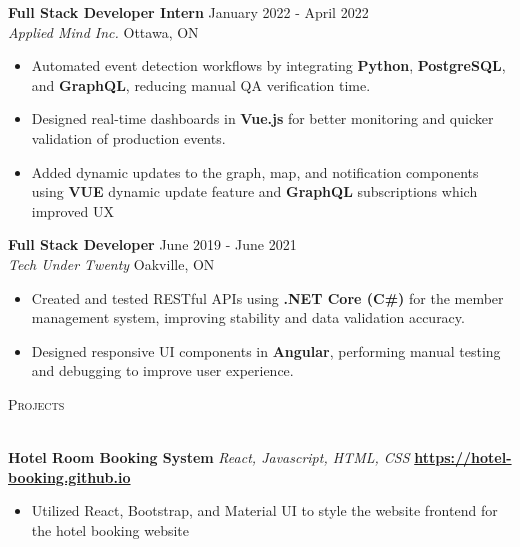 \documentclass[a4paper]{article}
\newcommand{\header} [1] {
    {\hspace*{-18pt}\vspace*{6pt} \textsc{#1}}
    \vspace*{-6pt} \\
    \hspace*{-18pt} \hrulefill \\
}
\begin{document}
\textbf{Full Stack Developer Intern} \hfill January 2022 - April 2022\\
\textit{Applied Mind Inc.} \hfill Ottawa, ON\\
\vspace{-2mm}
\begin{itemize} \itemsep -2pt
    \item Automated event detection workflows by integrating \textbf{Python}, \textbf{PostgreSQL}, and \textbf{GraphQL}, reducing manual QA verification time.
    \item Designed real-time dashboards in \textbf{Vue.js} for better monitoring and quicker validation of production events.
     \item Added dynamic updates to the graph, map, and notification components using \textbf{VUE} dynamic update feature and \textbf{GraphQL} subscriptions which improved UX
\end{itemize}

\textbf{Full Stack Developer} \hfill June 2019 - June 2021\\
\textit{Tech Under Twenty} \hfill Oakville, ON\\
\vspace{-2mm}
\begin{itemize} \itemsep -2pt
    \item Created and tested RESTful APIs using \textbf{.NET Core (C\#)} for the member management system, improving stability and data validation accuracy.
    \item Designed responsive UI components in \textbf{Angular}, performing manual testing and debugging to improve user experience.
\end{itemize}

\header{Projects}
\vspace{1mm}

{\textbf{Hotel Room Booking System}} {\sl React, Javascript, HTML, CSS} \hfill \textbf{\href{https://muizzzafar11.github.io/hotel-booking/}{https://hotel-booking.github.io}}\\
 \begin{itemize} \itemsep -2pt
    \item Utilized React, Bootstrap, and Material UI to style the website frontend for the hotel booking website 
\end{itemize}
\end{document}
